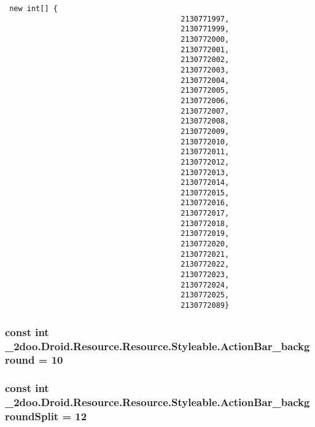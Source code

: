 \begin{Code}\begin{verbatim} new int[] {
                                        2130771997,
                                        2130771999,
                                        2130772000,
                                        2130772001,
                                        2130772002,
                                        2130772003,
                                        2130772004,
                                        2130772005,
                                        2130772006,
                                        2130772007,
                                        2130772008,
                                        2130772009,
                                        2130772010,
                                        2130772011,
                                        2130772012,
                                        2130772013,
                                        2130772014,
                                        2130772015,
                                        2130772016,
                                        2130772017,
                                        2130772018,
                                        2130772019,
                                        2130772020,
                                        2130772021,
                                        2130772022,
                                        2130772023,
                                        2130772024,
                                        2130772025,
                                        2130772089}
\end{verbatim}
\end{Code}
\hypertarget{class__2doo_1_1_droid_1_1_resource_1_1_styleable_dbf6d90ed3ed1fa65340217887a05ce0}{
\subsubsection[{ActionBar\_\-background}]{\setlength{\rightskip}{0pt plus 5cm}const int \_\-2doo.Droid.Resource.Resource.Styleable.ActionBar\_\-background = 10}}
\label{class__2doo_1_1_droid_1_1_resource_1_1_styleable_dbf6d90ed3ed1fa65340217887a05ce0}


\hypertarget{class__2doo_1_1_droid_1_1_resource_1_1_styleable_7d76265b46e3d0e7e411b5770a525d36}{
\subsubsection[{ActionBar\_\-backgroundSplit}]{\setlength{\rightskip}{0pt plus 5cm}const int \_\-2doo.Droid.Resource.Resource.Styleable.ActionBar\_\-backgroundSplit = 12}}
\label{class__2doo_1_1_droid_1_1_resource_1_1_styleable_7d76265b46e3d0e7e411b5770a525d36}


